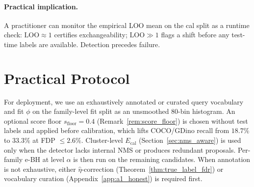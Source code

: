 \documentclass{article}
\theoremstyle{remark}
\newcommand{\1}{\mathbf{1}}
\begin{document}
\paragraph{Practical implication.}
A practitioner can monitor the empirical LOO mean on the cal split as
a runtime check: $\mathrm{LOO}\!\approx\!1$ certifies exchangeability;
$\mathrm{LOO}\!\gg\!1$ flags a shift before any test-time labels are
available. Detection precedes failure.

\section{Practical Protocol}
\label{app:protocol}

For deployment, we use an exhaustively annotated or curated query
vocabulary and fit $\phi$ on the family-level fit split as an
unsmoothed 80-bin histogram. An optional score floor
$s_{\mathrm{floor}}\!=\!0.4$ (Remark~\ref{rem:score_floor}) is
chosen without test labels and applied before calibration, which
lifts COCO/GDino recall from $18.7\%$ to $33.3\%$ at FDP
$\le 2.6\%$. Cluster-level $E_{\mathrm{cal}}$
(Section~\ref{sec:nms_aware}) is used only when the detector lacks
internal NMS or produces redundant proposals. Per-family e-BH at
level $\alpha$ is then run on the remaining candidates. When
annotation is not exhaustive, either $\hat\eta$-correction
(Theorem~\ref{thm:true_label_fdr}) or vocabulary curation
(Appendix~\ref{app:a1_honest}) is required first.

\newpage

\end{document}
